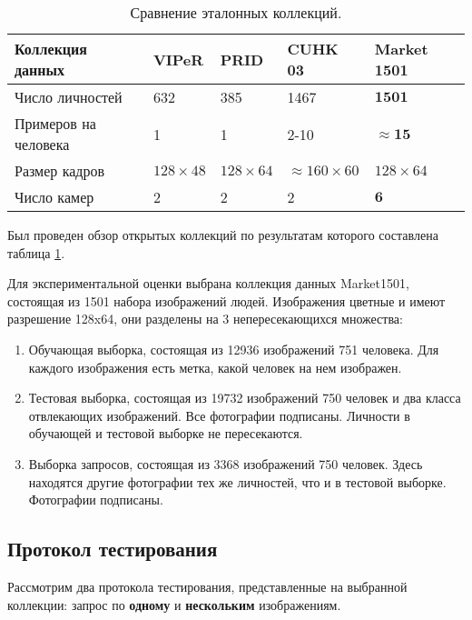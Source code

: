 \documentclass[a4paper]{article}
\begin{document}
\begin{multicols*}{2}
\begin{table}[H]\footnotesize
    \caption{Сравнение эталонных коллекций.}
    \label{datasets}
    \centering\medskip\tabcolsep=2pt%
    \begin{tabular}{ p{2.5cm} p{1cm} p{1cm} p{1.4cm} p{1.4cm} } 
        \hline 
        Коллекция данных & VIPeR\cite{viper} & PRID\cite{prid} & CUHK 03\cite{cuhk03} & Market 1501\cite{market1501} \\
        \hline
        Число личностей & 632 & 385 & 1467 & $\mathbf{1501}$ \\
        Примеров на человека & 1 & 1 & 2-10 & $\mathbf{\approx 15}$ \\
        Размер кадров & $128\times48$ & $128\times64$ & $\approx160\times60$ & $128\times64$ \\
        Число камер & 2 & 2 & 2 & $\mathbf{6}$ \\
        \hline
    \end{tabular}
\end{table}

Был проведен обзор открытых коллекций по результатам которого составлена таблица \ref{datasets}.

Для экспериментальной оценки выбрана коллекция данных Market1501, состоящая из 1501 набора изображений людей. Изображения цветные и имеют разрешение 128x64, они разделены на 3 непересекающихся множества:

\begin{enumerate}
    \item Обучающая выборка, состоящая из 12936 изображений 751 человека. Для каждого изображения есть метка, какой человек на нем изображен.
    \item Тестовая выборка, состоящая из 19732 изображений 750 человек и два класса отвлекающих изображений. Все фотографии подписаны. Личности в обучающей и тестовой выборке не пересекаются.
    \item Выборка запросов, состоящая из 3368 изображений 750 человек. Здесь находятся другие фотографии тех же личностей, что и в тестовой выборке. Фотографии подписаны.
\end{enumerate}
    
\subsection{Протокол тестирования}

Рассмотрим два протокола тестирования, представленные на выбранной коллекции: запрос по \textbf{одному} и \textbf{нескольким} изображениям.


\end{multicols*}
\end{document}

